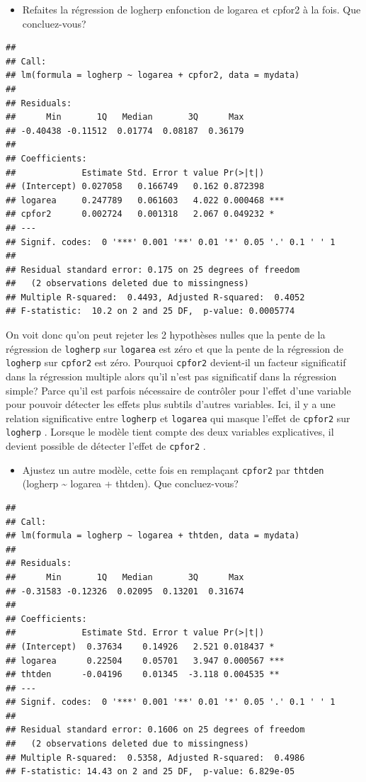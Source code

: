 \documentclass[
  12pt,
]{book}
\providecommand{\tightlist}{%
  \setlength{\itemsep}{0pt}\setlength{\parskip}{0pt}}
\begin{document}
\begin{itemize}
\tightlist
\item
  Refaites la régression de logherp enfonction de logarea et cpfor2 à la fois. Que concluez-vous?
\end{itemize}

\begin{verbatim}
## 
## Call:
## lm(formula = logherp ~ logarea + cpfor2, data = mydata)
## 
## Residuals:
##      Min       1Q   Median       3Q      Max 
## -0.40438 -0.11512  0.01774  0.08187  0.36179 
## 
## Coefficients:
##             Estimate Std. Error t value Pr(>|t|)    
## (Intercept) 0.027058   0.166749   0.162 0.872398    
## logarea     0.247789   0.061603   4.022 0.000468 ***
## cpfor2      0.002724   0.001318   2.067 0.049232 *  
## ---
## Signif. codes:  0 '***' 0.001 '**' 0.01 '*' 0.05 '.' 0.1 ' ' 1
## 
## Residual standard error: 0.175 on 25 degrees of freedom
##   (2 observations deleted due to missingness)
## Multiple R-squared:  0.4493, Adjusted R-squared:  0.4052 
## F-statistic:  10.2 on 2 and 25 DF,  p-value: 0.0005774
\end{verbatim}

On voit donc qu'on peut rejeter les 2 hypothèses nulles que la pente de la régression de \texttt{logherp} sur \texttt{logarea} est zéro et que la pente de la régression de \texttt{logherp} sur \texttt{cpfor2} est zéro. Pourquoi \texttt{cpfor2} devient-il un facteur significatif dans la régression multiple alors qu'il n'est pas significatif dans la régression simple? Parce qu'il est parfois nécessaire de contrôler pour l'effet d'une variable pour pouvoir détecter les effets plus subtils d'autres variables. Ici, il y a une relation significative entre \texttt{logherp} et \texttt{logarea} qui masque l'effet de \texttt{cpfor2} sur \texttt{logherp} . Lorsque le modèle tient compte des deux variables explicatives, il devient possible de détecter l'effet de \texttt{cpfor2} .

\begin{itemize}
\tightlist
\item
  Ajustez un autre modèle, cette fois en remplaçant \texttt{cpfor2} par \texttt{thtden} (logherp \textasciitilde{} logarea + thtden). Que concluez-vous?
\end{itemize}

\begin{verbatim}
## 
## Call:
## lm(formula = logherp ~ logarea + thtden, data = mydata)
## 
## Residuals:
##      Min       1Q   Median       3Q      Max 
## -0.31583 -0.12326  0.02095  0.13201  0.31674 
## 
## Coefficients:
##             Estimate Std. Error t value Pr(>|t|)    
## (Intercept)  0.37634    0.14926   2.521 0.018437 *  
## logarea      0.22504    0.05701   3.947 0.000567 ***
## thtden      -0.04196    0.01345  -3.118 0.004535 ** 
## ---
## Signif. codes:  0 '***' 0.001 '**' 0.01 '*' 0.05 '.' 0.1 ' ' 1
## 
## Residual standard error: 0.1606 on 25 degrees of freedom
##   (2 observations deleted due to missingness)
## Multiple R-squared:  0.5358, Adjusted R-squared:  0.4986 
## F-statistic: 14.43 on 2 and 25 DF,  p-value: 6.829e-05
\end{verbatim}
\end{document}
